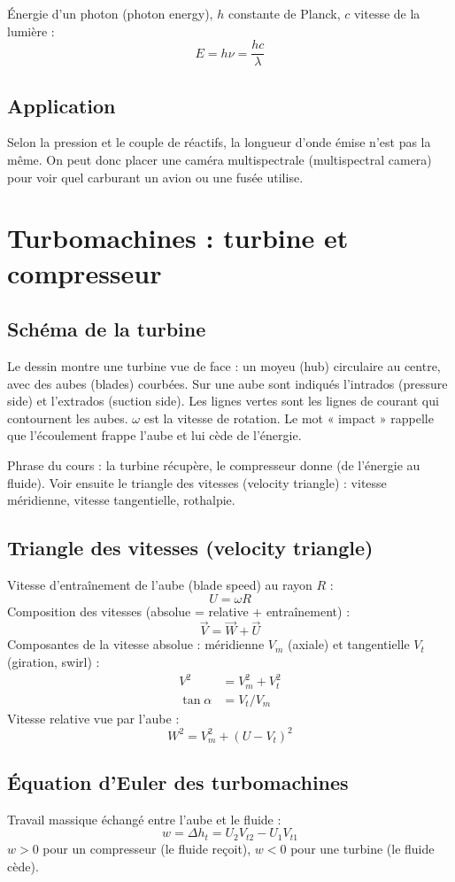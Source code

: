 \documentclass{article}
\begin{document}
Énergie d'un photon (photon energy), $h$ constante de Planck, $c$ vitesse de la lumière :
\[ E = h\nu = \frac{h c}{\lambda} \]

\subsection{Application}
Selon la pression et le couple de réactifs, la longueur d'onde émise n'est pas la même. On peut donc placer une caméra multispectrale (multispectral camera) pour voir quel carburant un avion ou une fusée utilise.

\section{Turbomachines : turbine et compresseur}

\subsection{Schéma de la turbine}
Le dessin montre une turbine vue de face : un moyeu (hub) circulaire au centre, avec des aubes (blades) courbées. Sur une aube sont indiqués l'intrados (pressure side) et l'extrados (suction side). Les lignes vertes sont les lignes de courant qui contournent les aubes. $\omega$ est la vitesse de rotation. Le mot « impact » rappelle que l'écoulement frappe l'aube et lui cède de l'énergie.

Phrase du cours : la turbine récupère, le compresseur donne (de l'énergie au fluide). Voir ensuite le triangle des vitesses (velocity triangle) : vitesse méridienne, vitesse tangentielle, rothalpie.

\subsection{Triangle des vitesses (velocity triangle)}
Vitesse d'entraînement de l'aube (blade speed) au rayon $R$ :
\[ U = \omega R \]
Composition des vitesses (absolue = relative + entraînement) :
\[ \vec{V} = \vec{W} + \vec{U} \]
Composantes de la vitesse absolue : méridienne $V_m$ (axiale) et tangentielle $V_t$ (giration, swirl) :
\begin{align}
V^2 &= V_m^2 + V_t^2 \\
\tan\alpha &= V_t / V_m
\end{align}
Vitesse relative vue par l'aube :
\[ W^2 = V_m^2 + (U - V_t)^2 \]

\subsection{Équation d'Euler des turbomachines}
Travail massique échangé entre l'aube et le fluide :
\[ w = \Delta h_t = U_2 V_{t2} - U_1 V_{t1} \]
$w > 0$ pour un compresseur (le fluide reçoit), $w < 0$ pour une turbine (le fluide cède).
\end{document}
